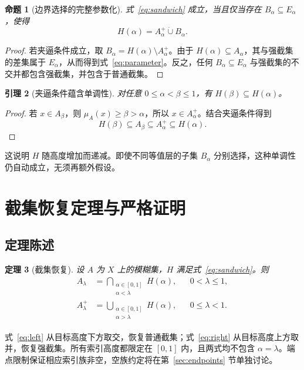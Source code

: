 \documentclass[UTF8,fontset=fandol,zihao=-4,a4paper]{ctexart}
\numberwithin{equation}{section}
\theoremstyle{reportplain}
\newtheorem{theorem}{定理}[section]
\newtheorem{proposition}[theorem]{命题}
\newtheorem{lemma}[theorem]{引理}
\newcommand{\muA}{\mu_A}
\newcommand{\cut}[1]{A_{#1}}
\newcommand{\scut}[1]{A_{#1}^{+}}
\newcommand{\eqtag}[1]{\label{#1}}
\begin{document}
\begin{proposition}[边界选择的完整参数化]
式~\eqref{eq:sandwich} 成立，当且仅当存在 $B_\alpha\subseteq E_\alpha$，使得
\begin{equation}
H(\alpha)=\scut{\alpha}\mathbin{\dot\cup}B_\alpha.
\eqtag{eq:parameter}
\end{equation}
\end{proposition}
\begin{proof}
若夹逼条件成立，取 $B_\alpha=H(\alpha)\setminus\scut{\alpha}$。由于 $H(\alpha)\subseteq\cut{\alpha}$，其与强截集的差集属于 $E_\alpha$，从而得到式~\eqref{eq:parameter}。反之，任何 $B_\alpha\subseteq E_\alpha$ 与强截集的不交并都包含强截集，并包含于普通截集。\end{proof}

\begin{lemma}[夹逼条件蕴含单调性]
对任意 $0\le\alpha<\beta\le1$，有 $H(\beta)\subseteq H(\alpha)$。
\end{lemma}
\begin{proof}
若 $x\in\cut{\beta}$，则 $\muA(x)\ge\beta>\alpha$，所以 $x\in\scut{\alpha}$。结合夹逼条件得到
\begin{equation}
H(\beta)\subseteq\cut{\beta}\subseteq\scut{\alpha}\subseteq H(\alpha).
\eqtag{eq:monotonic}
\end{equation}
\end{proof}
这说明 $H$ 随高度增加而递减。即使不同等值层的子集 $B_\alpha$ 分别选择，这种单调性仍自动成立，无须再额外假设。

\section{截集恢复定理与严格证明}
\subsection{定理陈述}
\begin{theorem}[截集恢复]
设 $A$ 为 $X$ 上的模糊集，$H$ 满足式~\eqref{eq:sandwich}。则
\begin{align}
\cut{\lambda}&=\bigcap_{\substack{\alpha\in[0,1]\\\alpha<\lambda}}H(\alpha),
&&0<\lambda\le1,\eqtag{eq:left}\\
\scut{\lambda}&=\bigcup_{\substack{\alpha\in[0,1]\\\alpha>\lambda}}H(\alpha),
&&0\le\lambda<1.\eqtag{eq:right}
\end{align}
\end{theorem}

式~\eqref{eq:left} 从目标高度下方取交，恢复普通截集；式~\eqref{eq:right} 从目标高度上方取并，恢复强截集。所有索引高度都限定在 $[0,1]$ 内，且两式均不包含 $\alpha=\lambda$。端点限制保证相应索引族非空，空族约定将在第~\ref{sec:endpoints} 节单独讨论。
\end{document}
